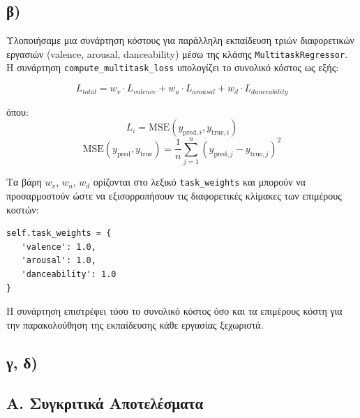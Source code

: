 \documentclass[a4paper,12pt]{article}
\begin{document}
\subsection*{β)}

Υλοποιήσαμε μια συνάρτηση κόστους για παράλληλη εκπαίδευση τριών διαφορετικών εργασιών (valence, arousal, danceability) μέσω της κλάσης \texttt{MultitaskRegressor}. Η συνάρτηση \texttt{compute\_multitask\_loss} υπολογίζει το συνολικό κόστος ως εξής:

\begin{equation}
    L_{total} = w_v \cdot L_{valence} + w_a \cdot L_{arousal} + w_d \cdot L_{danceability}
\end{equation}

όπου:
\[ L_i = \text{MSE}(y_{\text{pred},i}, y_{\text{true},i}) \]
\[ \text{MSE}(y_{\text{pred}}, y_{\text{true}}) = \frac{1}{n}\sum_{j=1}^n (y_{\text{pred},j} - y_{\text{true},j})^2 \]

Τα βάρη \(w_v\), \(w_a\), \(w_d\) ορίζονται στο λεξικό \texttt{task\_weights} και μπορούν να προσαρμοστούν ώστε να εξισορροπήσουν τις διαφορετικές κλίμακες των επιμέρους κοστών:

\begin{verbatim}
self.task_weights = {
   'valence': 1.0,
   'arousal': 1.0,
   'danceability': 1.0
}
\end{verbatim}

Η συνάρτηση επιστρέφει τόσο το συνολικό κόστος όσο και τα επιμέρους κόστη για την παρακολούθηση της εκπαίδευσης κάθε εργασίας ξεχωριστά.

\subsection*{γ, δ)}

\subsection*{Α. Συγκριτικά Αποτελέσματα}
\end{document}
